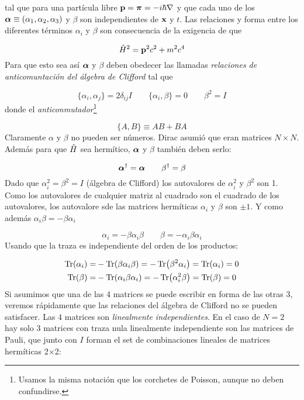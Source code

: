 tal que para una partícula libre $\mathbf{p} = \boldsymbol{\pi} =  - i \hbar \nabla$ y que cada uno de los  $\boldsymbol{\alpha}\equiv (\alpha_1,\alpha_2,\alpha_3)$ y $\beta$ son independientes de $\mathbf{x}$ y $t$. Las relaciones y forma entre los diferentes términos $\alpha_i$ y $\beta$ son consecuencia de la exigencia de que

\begin{equation}
	\hat{H}^2 = \mathbf{p}^2 c^2 + m^2 c^4
\end{equation}
Para que esto sea así $\boldsymbol{\alpha}$ y $\beta$ deben obedecer las llamadas \textit{relaciones de anticomuntación del álgebra de Clifford} tal que

\begin{equation}
	\{ \alpha_i,\alpha_j \} = 2 \delta_{ij} I \qquad \{\alpha_i,\beta\}=0 \qquad \beta^2=I
\end{equation}
donde el \textit{anticonmutador}\footnote{Usamos la misma notación que los corchetes de Poisson, aunque no deben confundirse.}

\begin{equation}
	\{A,B\} \equiv AB+BA
\end{equation}
Claramente $\alpha$ y $\beta$ no pueden ser números. Dirac asumió que eran matrices $N\times N$. Además para que $\hat{H}$ sea hermítico, $\boldsymbol{\alpha}$ y $\beta$ también deben serlo:

\begin{equation}
	\boldsymbol{\alpha}^\dagger = \boldsymbol{\alpha} \qquad \beta^\dagger = \beta
\end{equation}
Dado que $\alpha_i^2 = \beta^2 =I$ (álgebra de Clifford) los autovalores de $\alpha_i^2$ y $\beta^2$ son 1. Como los autovalores de cualquier matriz al cuadrado son el cuadrado de los autovalores, los autovalore sde las matrices hermíticas $\alpha_i$ y $\beta$ son $\pm1$. Y como además $\alpha_i \beta = - \beta \alpha_i$ 

\begin{equation}
	\alpha_i = - \beta \alpha_i \beta \qquad \beta = - \alpha_i \beta \alpha_i
\end{equation}
Usando que la traza es independiente del orden de los productos:

\begin{equation}
	\begin{split}
	\Tr (\alpha_i) = & - \Tr (\beta \alpha_i \beta) = - \Tr (\beta^2 \alpha_i) = \Tr (\alpha_i) =  0 \\
	\Tr (\beta) = & - \Tr (\alpha_i \beta \alpha_i) = - \Tr (\alpha_i^2 \beta) = \Tr (\beta) =   0 
	\end{split}
\end{equation}
Si asumimos que una de las 4 matrices se puede escribir en forma de las otras 3, veremos rápidamente que las relaciones del álgebra de Clifford no se pueden satisfacer. Las 4 matrices son \textit{linealmente independientes}. En el caso de $N=2$ hay solo 3 matrices con traza nula linealmente independiente son las matrices de Pauli, que junto con $I$ forman el set de combinaciones lineales de matrices hermíticas 2$\times$2:

